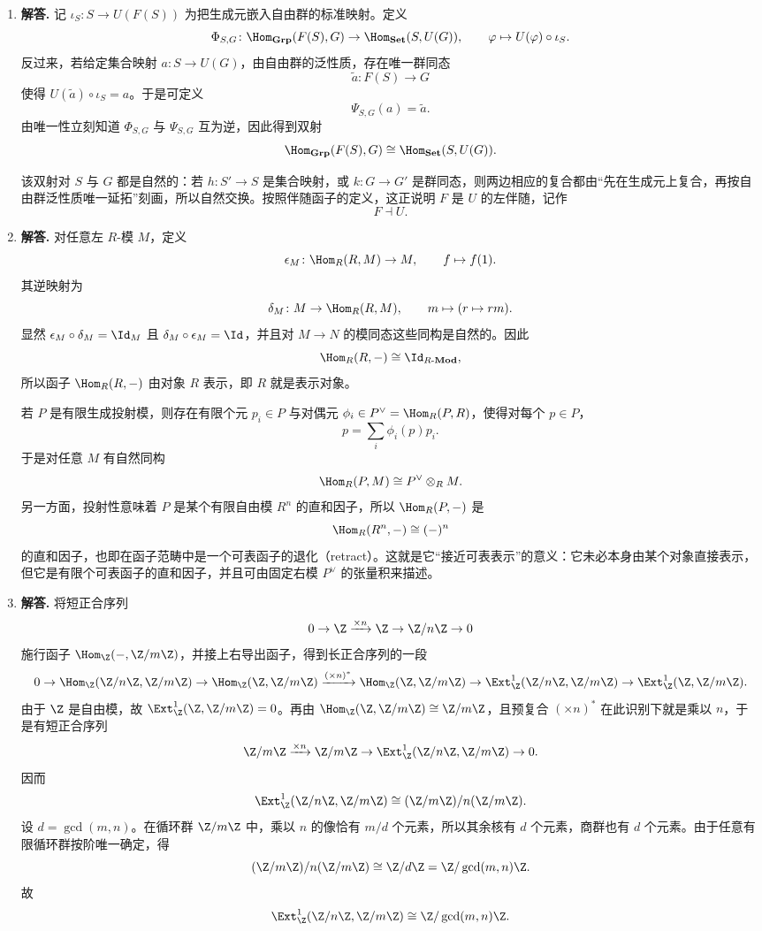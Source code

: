 \begin{enumerate}[label=\textbf{A.\arabic*.}, leftmargin=*, itemsep=1em]
  \item \textbf{解答.} 记 $\iota_S\colon S\to U(F(S))$ 为把生成元嵌入自由群的标准映射。定义
  \[
    \Phi_{S,G}\colon \Hom_{\mathbf{Grp}}(F(S),G)\to \Hom_{\mathbf{Set}}(S,U(G)),
    \qquad \varphi\mapsto U(\varphi)\circ \iota_S.
  \]
  反过来，若给定集合映射 $a\colon S\to U(G)$，由自由群的泛性质，存在唯一群同态
  \[
    \widetilde a\colon F(S)\to G
  \]
  使得 $U(\widetilde a)\circ \iota_S=a$。于是可定义
  \[
    \Psi_{S,G}(a)=\widetilde a.
  \]
  由唯一性立刻知道 $\Phi_{S,G}$ 与 $\Psi_{S,G}$ 互为逆，因此得到双射
  \[
    \Hom_{\mathbf{Grp}}(F(S),G)\cong \Hom_{\mathbf{Set}}(S,U(G)).
  \]

  该双射对 $S$ 与 $G$ 都是自然的：若 $h\colon S'\to S$ 是集合映射，或 $k\colon G\to G'$ 是群同态，则两边相应的复合都由“先在生成元上复合，再按自由群泛性质唯一延拓”刻画，所以自然交换。按照伴随函子的定义，这正说明 $F$ 是 $U$ 的左伴随，记作
  \[
    F\dashv U.
  \]

  \item \textbf{解答.} 对任意左 $R$-模 $M$，定义
  \[
    \epsilon_M\colon \Hom_R(R,M)\to M,
    \qquad f\mapsto f(1).
  \]
  其逆映射为
  \[
    \delta_M\colon M\to \Hom_R(R,M),
    \qquad m\mapsto (r\mapsto rm).
  \]
  显然 $\epsilon_M\circ \delta_M=\Id_M$ 且 $\delta_M\circ \epsilon_M=\Id$，并且对 $M\to N$ 的模同态这些同构是自然的。因此
  \[
    \Hom_R(R,-)\cong \Id_{R\text{-}\mathbf{Mod}},
  \]
  所以函子 $\Hom_R(R,-)$ 由对象 $R$ 表示，即 $R$ 就是表示对象。

  若 $P$ 是有限生成投射模，则存在有限个元 $p_i\in P$ 与对偶元 $\phi_i\in P^{\vee}=\Hom_R(P,R)$，使得对每个 $p\in P$，
  \[
    p=\sum_i \phi_i(p)p_i.
  \]
  于是对任意 $M$ 有自然同构
  \[
    \Hom_R(P,M)\cong P^{\vee}\otimes_R M.
  \]
  另一方面，投射性意味着 $P$ 是某个有限自由模 $R^n$ 的直和因子，所以 $\Hom_R(P,-)$ 是
  \[
    \Hom_R(R^n,-)\cong (-)^n
  \]
  的直和因子，也即在函子范畴中是一个可表函子的退化（retract）。这就是它“接近可表表示”的意义：它未必本身由某个对象直接表示，但它是有限个可表函子的直和因子，并且可由固定右模 $P^{\vee}$ 的张量积来描述。

  \item \textbf{解答.} 将短正合序列
  \[
    0\to \Z \xrightarrow{\times n} \Z \to \Z/n\Z \to 0
  \]
  施行函子 $\Hom_{\Z}(-,\Z/m\Z)$，并接上右导出函子，得到长正合序列的一段
  \[
    0\to \Hom_{\Z}(\Z/n\Z,\Z/m\Z)\to \Hom_{\Z}(\Z,\Z/m\Z)
    \xrightarrow{(\times n)^*} \Hom_{\Z}(\Z,\Z/m\Z)
    \to \Ext^1_{\Z}(\Z/n\Z,\Z/m\Z)\to \Ext^1_{\Z}(\Z,\Z/m\Z).
  \]
  由于 $\Z$ 是自由模，故 $\Ext^1_{\Z}(\Z,\Z/m\Z)=0$。再由 $\Hom_{\Z}(\Z,\Z/m\Z)\cong \Z/m\Z$，且预复合 $ (\times n)^*$ 在此识别下就是乘以 $n$，于是有短正合序列
  \[
    \Z/m\Z \xrightarrow{\times n} \Z/m\Z \to \Ext^1_{\Z}(\Z/n\Z,\Z/m\Z)\to 0.
  \]
  因而
  \[
    \Ext^1_{\Z}(\Z/n\Z,\Z/m\Z)
    \cong (\Z/m\Z)/n(\Z/m\Z).
  \]
  设 $d=\gcd(m,n)$。在循环群 $\Z/m\Z$ 中，乘以 $n$ 的像恰有 $m/d$ 个元素，所以其余核有 $d$ 个元素，商群也有 $d$ 个元素。由于任意有限循环群按阶唯一确定，得
  \[
    (\Z/m\Z)/n(\Z/m\Z)\cong \Z/d\Z=\Z/\gcd(m,n)\Z.
  \]
  故
  \[
    \Ext^1_{\Z}(\Z/n\Z,\Z/m\Z)\cong \Z/\gcd(m,n)\Z.
  \]
\end{enumerate}
